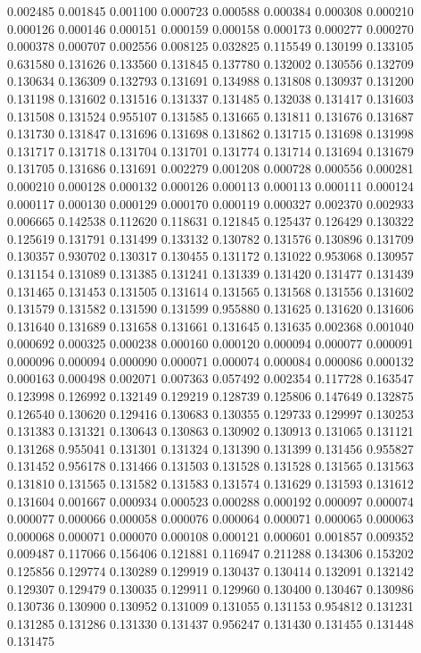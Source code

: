 0.002485
0.001845
0.001100
0.000723
0.000588
0.000384
0.000308
0.000210
0.000126
0.000146
0.000151
0.000159
0.000158
0.000173
0.000277
0.000270
0.000378
0.000707
0.002556
0.008125
0.032825
0.115549
0.130199
0.133105
0.631580
0.131626
0.133560
0.131845
0.137780
0.132002
0.130556
0.132709
0.130634
0.136309
0.132793
0.131691
0.134988
0.131808
0.130937
0.131200
0.131198
0.131602
0.131516
0.131337
0.131485
0.132038
0.131417
0.131603
0.131508
0.131524
0.955107
0.131585
0.131665
0.131811
0.131676
0.131687
0.131730
0.131847
0.131696
0.131698
0.131862
0.131715
0.131698
0.131998
0.131717
0.131718
0.131704
0.131701
0.131774
0.131714
0.131694
0.131679
0.131705
0.131686
0.131691
0.002279
0.001208
0.000728
0.000556
0.000281
0.000210
0.000128
0.000132
0.000126
0.000113
0.000113
0.000111
0.000124
0.000117
0.000130
0.000129
0.000170
0.000119
0.000327
0.002370
0.002933
0.006665
0.142538
0.112620
0.118631
0.121845
0.125437
0.126429
0.130322
0.125619
0.131791
0.131499
0.133132
0.130782
0.131576
0.130896
0.131709
0.130357
0.930702
0.130317
0.130455
0.131172
0.131022
0.953068
0.130957
0.131154
0.131089
0.131385
0.131241
0.131339
0.131420
0.131477
0.131439
0.131465
0.131453
0.131505
0.131614
0.131565
0.131568
0.131556
0.131602
0.131579
0.131582
0.131590
0.131599
0.955880
0.131625
0.131620
0.131606
0.131640
0.131689
0.131658
0.131661
0.131645
0.131635
0.002368
0.001040
0.000692
0.000325
0.000238
0.000160
0.000120
0.000094
0.000077
0.000091
0.000096
0.000094
0.000090
0.000071
0.000074
0.000084
0.000086
0.000132
0.000163
0.000498
0.002071
0.007363
0.057492
0.002354
0.117728
0.163547
0.123998
0.126992
0.132149
0.129219
0.128739
0.125806
0.147649
0.132875
0.126540
0.130620
0.129416
0.130683
0.130355
0.129733
0.129997
0.130253
0.131383
0.131321
0.130643
0.130863
0.130902
0.130913
0.131065
0.131121
0.131268
0.955041
0.131301
0.131324
0.131390
0.131399
0.131456
0.955827
0.131452
0.956178
0.131466
0.131503
0.131528
0.131528
0.131565
0.131563
0.131810
0.131565
0.131582
0.131583
0.131574
0.131629
0.131593
0.131612
0.131604
0.001667
0.000934
0.000523
0.000288
0.000192
0.000097
0.000074
0.000077
0.000066
0.000058
0.000076
0.000064
0.000071
0.000065
0.000063
0.000068
0.000071
0.000070
0.000108
0.000121
0.000601
0.001857
0.009352
0.009487
0.117066
0.156406
0.121881
0.116947
0.211288
0.134306
0.153202
0.125856
0.129774
0.130289
0.129919
0.130437
0.130414
0.132091
0.132142
0.129307
0.129479
0.130035
0.129911
0.129960
0.130400
0.130467
0.130986
0.130736
0.130900
0.130952
0.131009
0.131055
0.131153
0.954812
0.131231
0.131285
0.131286
0.131330
0.131437
0.956247
0.131430
0.131455
0.131448
0.131475
